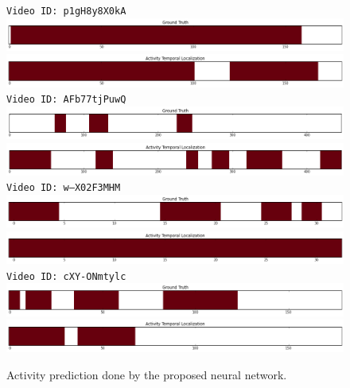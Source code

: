 \begin{figure}[H]
\begin{center}
\texttt{Video ID: p1gH8y8X0kA}
\includegraphics[width=1\linewidth]{img/results/results_visualization_detection_a_1}
\includegraphics[width=1\linewidth]{img/results/results_visualization_detection_a_2}
\texttt{Video ID: AFb77tjPuwQ}
\includegraphics[width=1\linewidth]{img/results/results_visualization_detection_b_1}
\includegraphics[width=1\linewidth]{img/results/results_visualization_detection_b_2}
\texttt{Video ID: w--X02F3MHM}
\includegraphics[width=1\linewidth]{img/results/results_visualization_detection_c_1}
\includegraphics[width=1\linewidth]{img/results/results_visualization_detection_c_2}
\texttt{Video ID: cXY-ONmtylc}
\includegraphics[width=1\linewidth]{img/results/results_visualization_detection_d_1}
\includegraphics[width=1\linewidth]{img/results/results_visualization_detection_d_2}
\end{center}
\caption{Activity prediction done by the proposed neural network.}
\label{fig:results_visualization_detection}
\end{figure}

